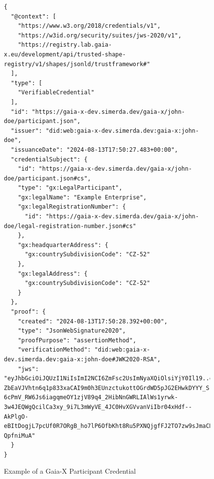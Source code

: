 \begin{figure}
\centering
\begin{verbatim}
{
  "@context": [
    "https://www.w3.org/2018/credentials/v1",
    "https://w3id.org/security/suites/jws-2020/v1",
    "https://registry.lab.gaia-x.eu/development/api/trusted-shape-registry/v1/shapes/jsonld/trustframework#"
  ],
  "type": [
    "VerifiableCredential"
  ],
  "id": "https://gaia-x-dev.simerda.dev/gaia-x/john-doe/participant.json",
  "issuer": "did:web:gaia-x-dev.simerda.dev:gaia-x:john-doe",
  "issuanceDate": "2024-08-13T17:50:27.483+00:00",
  "credentialSubject": {
    "id": "https://gaia-x-dev.simerda.dev/gaia-x/john-doe/participant.json#cs",
    "type": "gx:LegalParticipant",
    "gx:legalName": "Example Enterprise",
    "gx:legalRegistrationNumber": {
      "id": "https://gaia-x-dev.simerda.dev/gaia-x/john-doe/legal-registration-number.json#cs"
    },
    "gx:headquarterAddress": {
      "gx:countrySubdivisionCode": "CZ-52"
    },
    "gx:legalAddress": {
      "gx:countrySubdivisionCode": "CZ-52"
    }
  },
  "proof": {
    "created": "2024-08-13T17:50:28.392+00:00",
    "type": "JsonWebSignature2020",
    "proofPurpose": "assertionMethod",
    "verificationMethod": "did:web:gaia-x-dev.simerda.dev:gaia-x:john-doe#JWK2020-RSA",
    "jws": "eyJhbGciOiJQUzI1NiIsImI2NCI6ZmFsc2UsImNyaXQiOlsiYjY0Il19..cPShjGoSpCKGfjU6pvjQnGeXCiN36smCdSpkPwp6Ruf24bSzvKQ2Slg9mve84-ZbEaVJVhtn6q1p833xaCAI9m0h3EUnzctukottOGrdWD5pJG2EHwkDYYY_SrfOT_Y7uIYaSf46_2FPAzvHxGoTRGPkvR-6cPmV_RW6Js6iagqmeOY1zjV89q4_2HibNnGWRLIAlWs1yrwk-3w4JEQWgQcilCa3xy_9i7L3mWyVE_4JC0HvXGVvanViIbr04xHdf--AkPlgO-eBItDogjL7pcUf0R7ORgB_ho7lP6OfbKht8Ru5PXNQjgfFJ2TO7zw9sJmaCRCqenCjn-QpfniMuA"
  }
}
\end{verbatim}
\caption{Example of a Gaia-X Participant Credential}\label{fig:gaia_x_credential_example}
\end{figure}


